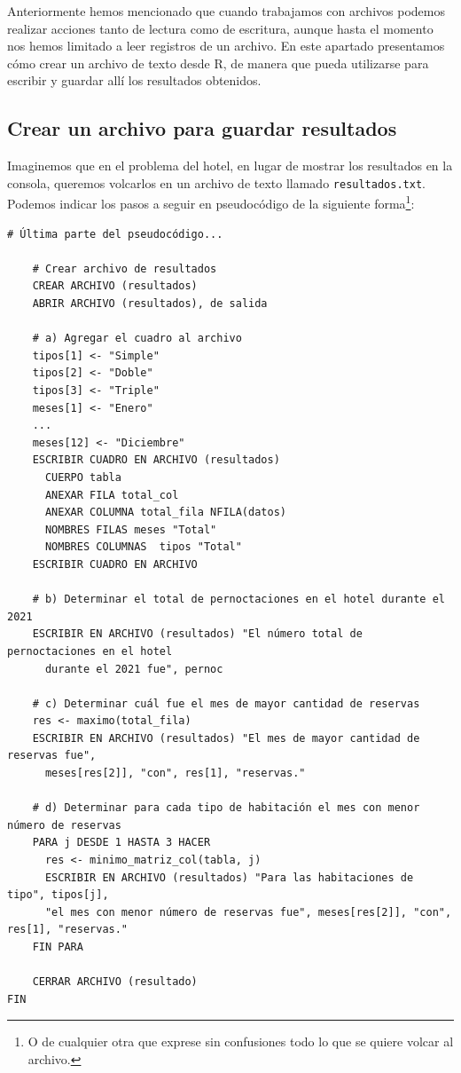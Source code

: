 \documentclass[
]{book}
\begin{document}
Anteriormente hemos mencionado que cuando trabajamos con archivos podemos realizar acciones tanto de lectura como de escritura, aunque hasta el momento nos hemos limitado a leer registros de un archivo. En este apartado presentamos cómo crear un archivo de texto desde R, de manera que pueda utilizarse para escribir y guardar allí los resultados obtenidos.

\hypertarget{crear-un-archivo-para-guardar-resultados}{%
\subsection{Crear un archivo para guardar resultados}\label{crear-un-archivo-para-guardar-resultados}}

Imaginemos que en el problema del hotel, en lugar de mostrar los resultados en la consola, queremos volcarlos en un archivo de texto llamado \texttt{resultados.txt}. Podemos indicar los pasos a seguir en pseudocódigo de la siguiente forma\footnote{O de cualquier otra que exprese sin confusiones todo lo que se quiere volcar al archivo.}:

\begin{verbatim}
# Última parte del pseudocódigo...

    # Crear archivo de resultados
    CREAR ARCHIVO (resultados)
    ABRIR ARCHIVO (resultados), de salida
    
    # a) Agregar el cuadro al archivo
    tipos[1] <- "Simple"
    tipos[2] <- "Doble"
    tipos[3] <- "Triple"
    meses[1] <- "Enero"
    ...
    meses[12] <- "Diciembre"
    ESCRIBIR CUADRO EN ARCHIVO (resultados)
      CUERPO tabla
      ANEXAR FILA total_col
      ANEXAR COLUMNA total_fila NFILA(datos)
      NOMBRES FILAS meses "Total"
      NOMBRES COLUMNAS  tipos "Total"
    ESCRIBIR CUADRO EN ARCHIVO
    
    # b) Determinar el total de pernoctaciones en el hotel durante el 2021
    ESCRIBIR EN ARCHIVO (resultados) "El número total de pernoctaciones en el hotel 
      durante el 2021 fue", pernoc
    
    # c) Determinar cuál fue el mes de mayor cantidad de reservas
    res <- maximo(total_fila)
    ESCRIBIR EN ARCHIVO (resultados) "El mes de mayor cantidad de reservas fue", 
      meses[res[2]], "con", res[1], "reservas."
    
    # d) Determinar para cada tipo de habitación el mes con menor número de reservas
    PARA j DESDE 1 HASTA 3 HACER
      res <- minimo_matriz_col(tabla, j)
      ESCRIBIR EN ARCHIVO (resultados) "Para las habitaciones de tipo", tipos[j], 
      "el mes con menor número de reservas fue", meses[res[2]], "con", res[1], "reservas."
    FIN PARA
    
    CERRAR ARCHIVO (resultado)
FIN
\end{verbatim}
\end{document}
